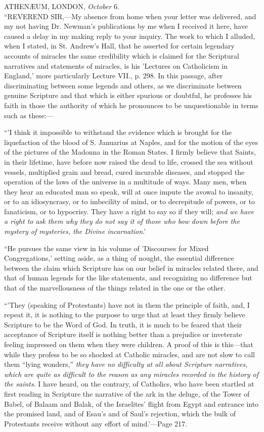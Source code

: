 ATHENÆUM, LONDON, \emph{October} 6. \emph{}\\
``REVEREND SIR,—My absence from home when
your letter was delivered, and my not having Dr. Newman's
publications by me when I received it here, have caused a
delay in my making reply to your inquiry. The work to
which I alluded, when I stated, in St. Andrew's Hall,
that he asserted for certain legendary accounts of
miracles the same credibility which is claimed for the
Scriptural narratives and statements of miracles, is his
'Lectures on Catholicism in England,' more particularly
Lecture VII., p. 298. In this passage, after discriminating
between some legends and others, as we discriminate
between genuine Scripture and that which is either
spurious or doubtful, he professes his faith in those the
authority of which he pronounces to be unquestionable in
terms such as these:—


``'I think it impossible to withstand the evidence
which is brought for the liquefaction of the blood of S.
Januarius at Naples, and for the motion of the eyes of
the pictures of the Madonna in the Roman States. I firmly
believe that Saints, in their lifetime, have before now
raised the dead to life, crossed the sea without vessels,
multiplied grain and bread, cured incurable diseases, and
stopped the operation of the laws of the universe in a
multitude of ways. Many men, when they hear an educated
man so speak, will at once impute the avowal to insanity,
or to an idiosyncrasy, or to imbecility of mind, or to
decrepitude of powers, or to fanaticism, or to hypocrisy.
They have a right to say so if they will; \emph{and we have
a right to ask them why they do not say it of those who
bow down before the mystery of mysteries, the Divine incarnation}.'


``He pursues the same view in his volume of
'Discourses for Mixed Congregations,' setting aside, as a
thing of nought, the essential difference between the
claim which Scripture has on our belief in miracles
related there, and that of human legends for the like
statements, and recognizing no difference but that of the
marvellousness of the things related in the one or the
other.


``'They (speaking of Protestants) have not in them
the principle of faith, and, I repeat it, it is nothing
to the purpose to urge that at least they firmly believe
Scripture to be the Word of God. In truth, it is much to
be feared that their acceptance of Scripture itself is
nothing better than a prejudice or inveterate feeling
impressed on them when they were children. A proof of
this is this—that while they profess to be so
shocked at Catholic miracles, and are not slow to call
them ``lying wonders,'' \emph{they have no} \emph{difficulty
at all about Scripture narratives, which are quite as
difficult to the reason as any miracles recorded in the
history of the saints}.\textbf{\emph{ }}I have heard, on
the contrary, of Catholics, who have been startled at
first reading in Scripture the narrative of the ark in
the deluge, of the Tower of Babel, of Balaam and Balak,
of the Israelites' flight from Egypt and entrance into
the promised land, and of Esau's and of Saul's rejection,
which the bulk of Protestants receive without any effort
of mind.'—Page 217.


